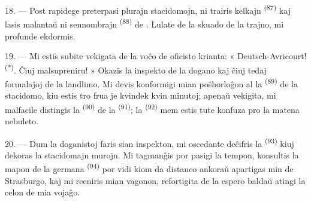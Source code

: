 18. --- Post rapidege preterpasi plurajn stacidomojn, ni trairis kelkajn
 \textsuperscript{(87)} kaj lasis malantaŭ ni 
sennombrajn \textsuperscript{(88)} de . Lulate de la
skuado de la trajno, mi profunde ekdormis.

\VUsaut{3.0mm}
\VUsaut{3.0mm}

19. --- Mi estis subite vekigata de la voĉo de oficisto krianta:
« Deutsch-Avricourt! \textsuperscript{(*)}. Ĉiuj malsupreniru! » Okazis la
inspekto de la dogano kaj ĉiuj tedaj formalaĵoj de la landlimo. Mi devis
konformigi mian poŝhorloĝon al la  \textsuperscript{(89)} de
la stacidomo, kiu estis tro frua je kvindek kvin minutoj; apenaŭ vekigita, mi
malfacile distingis la  \textsuperscript{(90)} de la
 \textsuperscript{(91)}; la 
\textsuperscript{(92)} mem estis tute konfuza pro la matena nebuleto.

20. --- Dum la doganistoj faris sian inspekton, mi oscedante deĉifris la
 \textsuperscript{(93)} kiuj dekoras la stacidomajn murojn. Mi
tagmanĝis por pasigi la tempon, konsultis la mapon de la germana 
\textsuperscript{(94)} por vidi kiom da distanco ankoraŭ apartigas min de
Strasburgo, kaj mi reeniris mian vagonon, refortigita de la espero baldaŭ
atingi la celon de mia vojaĝo.
\VUsaut{6.0mm}
\VUfilet{22mm}
